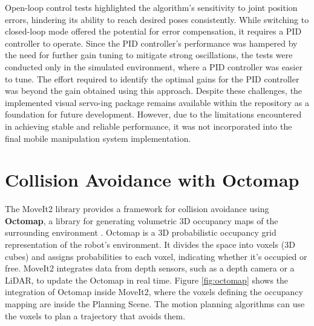Open-loop control tests highlighted the algorithm's sensitivity to joint position errors, hindering its ability
to reach desired poses consistently. While switching to closed-loop mode offered the potential for error compensation, 
it requires a PID controller to operate. Since the PID controller's performance was hampered by the need for 
further gain tuning to mitigate strong oscillations, the tests were conducted only in the simulated environment,
where a PID controller was easier to tune. The effort required to identify the optimal gains for the PID controller
was beyond the gain obtained using this approach.
Despite these challenges, the implemented visual servo-ing package remains available within the repository as a foundation
for future development. However, due to the limitations encountered in achieving stable and reliable performance,
it was not incorporated into the final mobile manipulation system implementation.


\section{Collision Avoidance with Octomap}

The MoveIt2 library provides a framework for collision avoidance using \textbf{Octomap}, a library for
generating volumetric 3D occupancy maps of the surrounding environment \cite{hornung13octomap}.
Octomap is a 3D probabilistic occupancy grid representation of the robot's environment. It divides the space into voxels
(3D cubes) and assigns probabilities to each voxel, indicating whether it's occupied or free.
MoveIt2 integrates data from depth sensors, such as a depth camera or a LiDAR, to update the Octomap in real time.
Figure \ref{fig:octomap} shows the integration of Octomap inside MoveIt2, where the voxels defining the occupancy
mapping are inside the Planning Scene. The motion planning algorithms can use the voxels to plan a trajectory
that avoids them.

